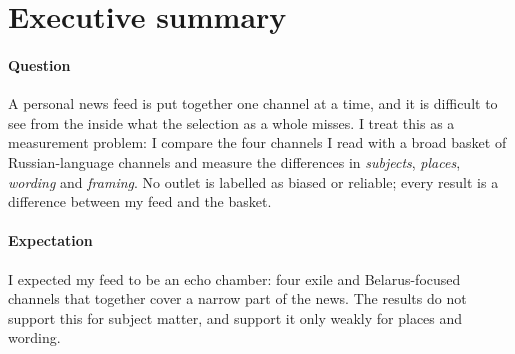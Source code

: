 \documentclass[11pt,a4paper]{article}
\begin{document}
\tableofcontents
\clearpage

\section{Executive summary}
\label{sec:summary}

\paragraph{Question} A personal news feed is put together one channel at a time, and it is difficult to see from the inside what the selection as a whole misses. I treat this as a measurement problem: I compare the four channels I read with a broad basket of Russian-language channels and measure the differences in \emph{subjects}, \emph{places}, \emph{wording} and \emph{framing}. No outlet is labelled as biased or reliable; every result is a difference between my feed and the basket.

\paragraph{Expectation} I expected my feed to be an echo chamber: four exile and Belarus-focused channels that together cover a narrow part of the news. The results do not support this for subject matter, and support it only weakly for places and wording.
\end{document}
